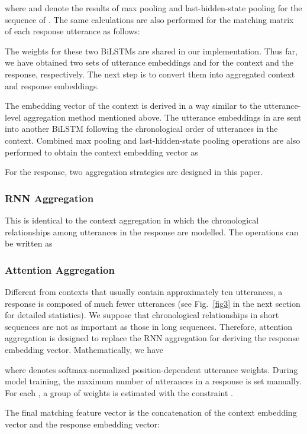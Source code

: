 \documentclass[journal]{IEEEtran}
\begin{document}
    where  and  denote the results of max pooling and last-hidden-state pooling for the sequence of .
    The same calculations are also performed for the matching matrix  of each response utterance as follows:
    
    The weights for these two BiLSTMs are shared in our implementation. Thus far, we have obtained two sets of utterance embeddings  and  for the context and the response, respectively. The next step is to convert them into aggregated context and response embeddings.

    The embedding vector of the context is derived in a way similar to the utterance-level aggregation method mentioned above. The utterance embeddings in  are sent into another BiLSTM following the chronological order of utterances in the context. Combined max pooling and last-hidden-state pooling operations are also performed to obtain the context embedding vector as
    

    For the response, two aggregation strategies are designed in this paper.
    \subsubsection{RNN Aggregation}
      This is identical to the context aggregation in which the chronological relationships among utterances in the response are modelled. The operations can be written as
      

    \subsubsection{Attention Aggregation}
      Different from contexts that usually contain approximately ten utterances, a response is composed of much fewer utterances (see Fig.~\ref{fig3} in the next section for detailed statistics). We suppose that chronological relationships in short sequences are not as important as those in long sequences. Therefore, attention aggregation is designed to replace the RNN aggregation for deriving the response embedding vector. Mathematically, we have
      
      where  denotes softmax-normalized position-dependent utterance weights. During model training, the maximum number of utterances in a response  is set manually. For each , a group of weights  is estimated with the constraint .

      The final matching feature vector is the concatenation of the context embedding vector and the response embedding vector:
      
\end{document}
